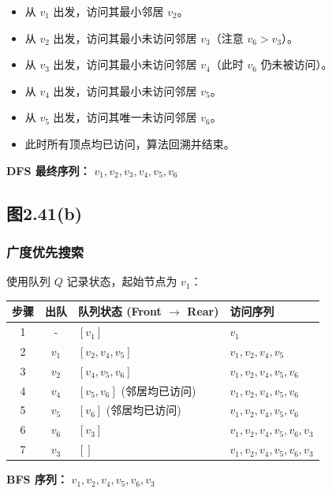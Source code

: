 \documentclass[utf8]{ctexart}
\theoremstyle{mystyle}
\begin{document}
\begin{itemize}
    \item 从 $v_1$ 出发，访问其最小邻居 $v_2$。
    \item 从 $v_2$ 出发，访问其最小未访问邻居 $v_3$（注意 $v_6 > v_3$）。
    \item 从 $v_3$ 出发，访问其最小未访问邻居 $v_4$（此时 $v_6$ 仍未被访问）。
    \item 从 $v_4$ 出发，访问其最小未访问邻居 $v_5$。
    \item 从 $v_5$ 出发，访问其唯一未访问邻居 $v_6$。
    \item 此时所有顶点均已访问，算法回溯并结束。
\end{itemize}

\textbf{DFS 最终序列：} $v_1, v_2, v_3, v_4, v_5, v_6$
\subsection*{图2.41(b)}
\begin{center}
\end{center}
\subsubsection*{广度优先搜索}
使用队列 $Q$ 记录状态，起始节点为 $v_1$：
\begin{table}[H]
    \centering
    \begin{tabular}{|c|c|l|l|}
        \hline\textbf{步骤} & \textbf{出队} & \textbf{队列状态 (Front $\to$ Rear)} & \textbf{访问序列} \\
        \hline1 & - & $[v_1]$ & $v_1$ \\ 
        \hline2 & $v_1$ & $[v_2, v_4, v_5]$ & $v_1, v_2, v_4, v_5$ \\ 
        \hline3 & $v_2$ & $[v_4, v_5, v_6]$ & $v_1, v_2, v_4, v_5, v_6$ \\ 
        \hline4 & $v_4$ & $[v_5, v_6]$ (邻居均已访问) & $v_1, v_2, v_4, v_5, v_6$ \\
        \hline5 & $v_5$ & $[v_6]$ (邻居均已访问) & $v_1, v_2, v_4, v_5, v_6$ \\ 
        \hline6 & $v_6$ & $[v_3]$ & $v_1, v_2, v_4, v_5, v_6, v_3$ \\ 
        \hline7 & $v_3$ & $[]$ & $v_1, v_2, v_4, v_5, v_6, v_3$ \\
        \hline
    \end{tabular}
\end{table}
\textbf{BFS 序列：} $v_1, v_2, v_4, v_5, v_6, v_3$
\end{document}
